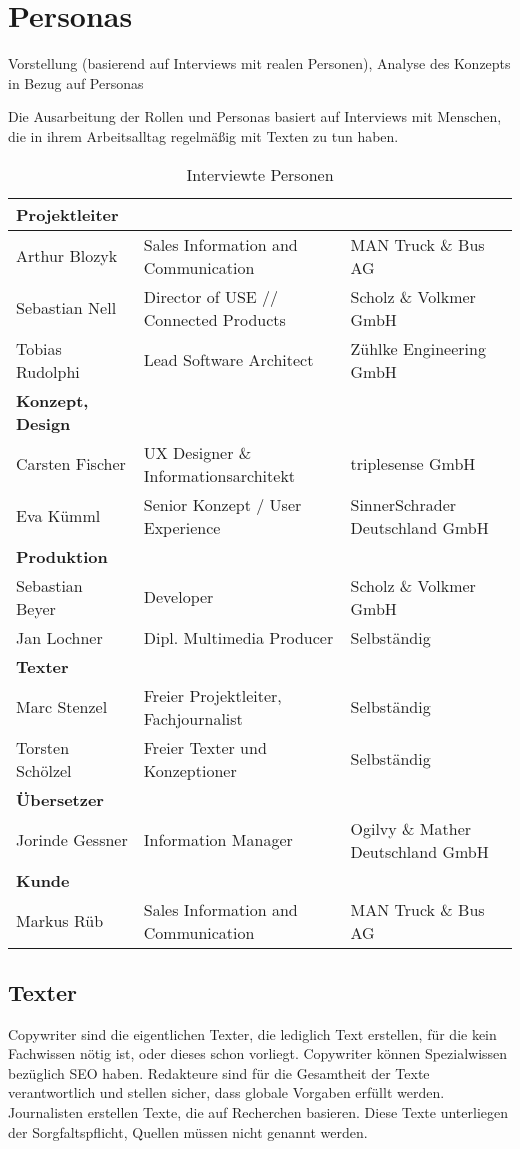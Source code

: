 \section{Personas}\label{l:personas}

Vorstellung (basierend auf Interviews mit realen Personen), Analyse des Konzepts in Bezug auf Personas

Die Ausarbeitung der Rollen und Personas basiert auf Interviews mit Menschen, die in ihrem Arbeitsalltag regelmäßig mit Texten zu tun haben.

\begin{table}
\begin{center}
\begin{tabular}{@{}l l l}
\textbf{Projektleiter} & &\\
\hline
Arthur Blozyk	& Sales Information and Communication	& MAN Truck \& Bus AG\\
Sebastian Nell & Director of USE // Connected Products & Scholz \& Volkmer GmbH\\
Tobias Rudolphi	& Lead Software Architect	& Zühlke Engineering GmbH\\
\textbf{Konzept, Design} & & \\
\hline
Carsten Fischer	& UX Designer \& Informationsarchitekt	& triplesense GmbH\\
Eva Kümml	& Senior Konzept / User Experience	& SinnerSchrader Deutschland GmbH\\
\textbf{Produktion} & & \\
\hline
Sebastian Beyer	& Developer	& Scholz \& Volkmer GmbH\\
Jan Lochner	& Dipl. Multimedia Producer	& Selbständig\\
\textbf{Texter} & & \\
\hline
Marc Stenzel	& Freier Projektleiter, Fachjournalist	& Selbständig\\
Torsten Schölzel	& Freier Texter und Konzeptioner	& Selbständig\\
\textbf{Übersetzer} & & \\
\hline
Jorinde Gessner	& Information Manager	& Ogilvy \& Mather Deutschland GmbH\\
\textbf{Kunde} & & \\
\hline
Markus Rüb	& Sales Information and Communication	& MAN Truck \& Bus AG
\end{tabular}
\caption{Interviewte Personen}
\label{table:textkriterien}
\end{center}
\end{table}

\subsection{Texter}

Copywriter sind die eigentlichen Texter, die lediglich Text erstellen, für die kein Fachwissen nötig ist, oder dieses schon vorliegt. Copywriter können Spezialwissen bezüglich SEO haben. Redakteure sind für die Gesamtheit der Texte verantwortlich und stellen sicher, dass globale Vorgaben erfüllt werden. Journalisten erstellen Texte, die auf Recherchen basieren. Diese Texte unterliegen der Sorgfaltspflicht, Quellen müssen nicht genannt werden. 